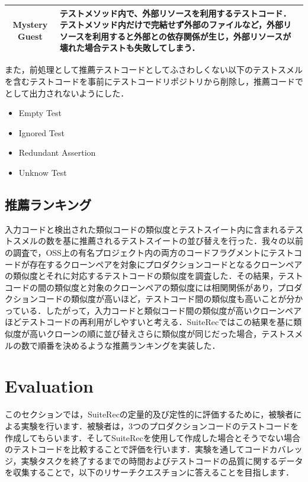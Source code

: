 \documentclass[conference]{IEEEtran}
\begin{document}
\begin{table}[hbtp]
\begin{tabular}{|c|p{5.5cm}|}
\textbf{Mystery Guest}          & テストメソッド内で、外部リソースを利用するテストコード．テストメソッド内だけで完結せず外部のファイルなど，外部リソースを利用すると外部との依存関係が生じ，外部リソースが壊れた場合テストも失敗してしまう．                                                                                                                \\ \hline
\end{tabular}
\end{table}


また，前処理として推薦テストコードとしてふさわしくない以下のテストスメルを含むテストコードを事前にテストコードリポジトリから削除し，推薦コードでとして出力されないようにした．　

\begin{itemize}
\item Empty Test
\item Ignored Test
\item Redundant Assertion
\item Unknow Test
\end{itemize}

\subsection{推薦ランキング}
入力コードと検出された類似コードの類似度とテストスイート内に含まれるテストスメルの数を基に推薦されるテストスイートの並び替えを行った．我々の以前の調査で，OSS上の有名プロジェクト内の両方のコードフラグメントにテストコードが存在するクローンペアを対象にプロダクションコードとなるクローンペアの類似度とそれに対応するテストコードの類似度を調査した．その結果，テストコードの間の類似度と対象のクローンペアの類似度には相関関係があり，プロダクションコードの類似度が高いほど，テストコード間の類似度も高いことが分かっている．したがって，入力コードと類似コード間の類似度が高いクローンペアほどテストコードの再利用がしやすいと考える．SuiteRecではこの結果を基に類似度が高いクローンの順に並び替えさらに類似度が同じだった場合，テストスメルの数で順番を決めるような推薦ランキングを実装した．

\section{Evaluation}

このセクションでは，SuiteRecの定量的及び定性的に評価するために，被験者による実験を行います．被験者は，3つのプロダクションコードのテストコードを作成してもらいます．そしてSuiteRecを使用して作成した場合とそうでない場合のテストコードを比較することで評価を行います．実験を通してコードカバレッジ，実験タスクを終了するまでの時間およびテストコードの品質に関するデータを収集することで，以下のリサーチクエスチョンに答えることを目指します．
\end{document}
